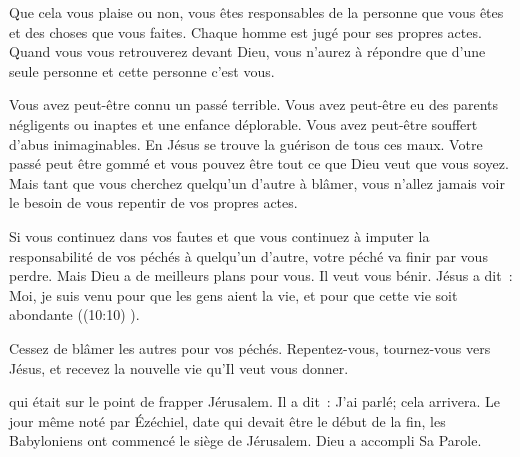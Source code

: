 Que cela vous plaise ou non, vous êtes responsables de la personne
 que vous êtes et des choses que vous faites.
 Chaque homme est jugé pour ses propres actes.
 Quand vous vous retrouverez devant Dieu, 
 vous n'aurez à répondre que d'une seule personne
 \ocadr et cette personne c'est vous. 


Vous avez peut-être connu un passé terrible.
 Vous avez peut-être eu des parents négligents ou inaptes
 et une enfance déplorable. Vous avez peut-être souffert
 d'abus inimaginables. En Jésus se trouve la guérison de tous ces maux.
 Votre passé peut être gommé et vous pouvez être tout ce que Dieu
 veut que vous soyez. Mais tant que vous cherchez 
 quelqu'un d'autre à blâmer, vous n'allez jamais voir le besoin
 de vous repentir de vos propres actes. 

Si vous continuez dans vos fautes et que vous continuez
 à imputer la responsabilité de vos péchés à quelqu'un d'autre,
 votre péché va finir par vous perdre.
 Mais Dieu a de meilleurs plans pour vous. Il veut vous bénir.
 Jésus a dit~: 
 \og Moi, je suis venu pour que les gens aient la vie,
 et pour que cette vie soit abondante \fg{} ((10:10) \BFC). 

Cessez de blâmer les autres pour vos péchés.
 Repentez-vous, tournez-vous vers Jésus,
 et recevez la nouvelle vie qu'Il veut vous donner. 

\dvrule






 qui était sur le point de frapper Jérusalem. Il a dit~: 
 \og J'ai parlé; cela arrivera. \fg{}
 Le jour même noté par Ézéchiel, date qui devait être le début de la fin,
 les Babyloniens ont commencé le siège de Jérusalem. Dieu a accompli Sa Parole. 

